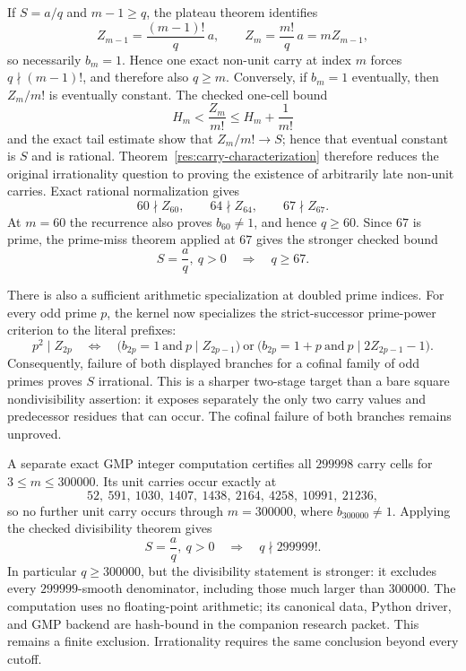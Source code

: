 \documentclass[11pt]{article}
\newcommand{\Ser}{S}
\begin{document}
\noindent
If $\Ser=a/q$ and $m-1\ge q$, the plateau theorem identifies
\[
  Z_{m-1}=\frac{(m-1)!}{q}\,a,\qquad
  Z_m=\frac{m!}{q}\,a=mZ_{m-1},
\]
so necessarily $b_m=1$.  Hence one exact non-unit carry at index $m$ forces
$q\nmid(m-1)!$, and therefore also $q\ge m$.  Conversely, if $b_m=1$
eventually, then $Z_m/m!$ is eventually constant.  The checked one-cell bound
\[
  H_m<\frac{Z_m}{m!}\le H_m+\frac1{m!}
\]
and the exact tail estimate show that $Z_m/m!\to\Ser$; hence that eventual
constant is $\Ser$ and is rational.  Theorem~\ref{res:carry-characterization}
therefore reduces the original irrationality question to proving the
existence of arbitrarily late non-unit carries.  Exact
rational normalization gives
\[
  60\nmid Z_{60},\qquad 64\nmid Z_{64},\qquad 67\nmid Z_{67}.
\]
At $m=60$ the recurrence also proves $b_{60}\ne1$, and hence $q\ge60$.
Since $67$ is prime, the prime-miss theorem applied at $67$ gives the stronger
checked bound
\[
  \Ser=\frac aq,\ q>0 \quad\Longrightarrow\quad q\ge67.
\]

There is also a sufficient arithmetic specialization at doubled prime indices.  For
every odd prime $p$, the kernel now specializes the strict-successor
prime-power criterion to the literal prefixes:
\[
  p^2\mid Z_{2p}
  \quad\Longleftrightarrow\quad
  \bigl(b_{2p}=1\ \text{and}\ p\mid Z_{2p-1}\bigr)
  \ \text{or}\
  \bigl(b_{2p}=1+p\ \text{and}\ p\mid 2Z_{2p-1}-1\bigr).
\]
Consequently, failure of both displayed branches for a cofinal family of odd
primes proves $\Ser$ irrational.  This is a sharper two-stage target than a
bare square nondivisibility assertion: it exposes separately the only two
carry values and predecessor residues that can occur.  The cofinal failure of
both branches remains unproved.

A separate exact GMP integer computation certifies all $299998$
carry cells for $3\le m\le300000$.  Its unit carries occur exactly at
\[
  52,\ 591,\ 1030,\ 1407,\ 1438,\ 2164,\ 4258,\ 10991,\ 21236,
\]
so no further unit carry occurs through $m=300000$, where
$b_{300000}\ne1$.  Applying the checked divisibility theorem gives
\[
  \Ser=\frac aq,\ q>0 \quad\Longrightarrow\quad q\nmid299999!.
\]
In particular $q\ge300000$, but the divisibility statement is stronger: it
excludes every $299999$-smooth denominator, including those much larger than
$300000$.
The computation uses no floating-point arithmetic; its canonical data,
Python driver, and GMP backend are hash-bound in the companion research
packet.  This remains a finite exclusion.  Irrationality requires the same
conclusion beyond every cutoff.
\end{document}
